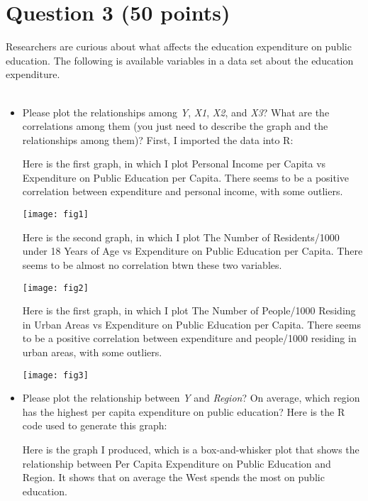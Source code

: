 \documentclass[12pt,letterpaper]{article}
\begin{document}
	\vspace{1cm}
	\section*{Question 3 (50 points)}
	
	\noindent Researchers are curious about what affects the education expenditure on public education. The following is available variables in a data set about the education expenditure. \\
	\\
		\begin{itemize}
		
		\item
		Please plot the relationships among \emph{Y}, \emph{X1}, \emph{X2}, and \emph{X3}? What are the correlations among them (you just need to describe the graph and the relationships among them)?
		\vspace{.5cm}
	\vspace{.5cm}
	\noindent First, I imported the data into R:
	   
	Here is the first graph, in which I plot Personal Income per Capita vs Expenditure on Public Education per Capita. There seems to be a positive correlation between expenditure and personal income, with some outliers.   
	
	\texttt{[image: fig1]}
	
	Here is the second graph, in which I plot The Number of Residents/1000 under 18 Years of Age vs Expenditure on Public Education per Capita. There seems to be almost no correlation btwn these two variables. 
	
	\texttt{[image: fig2]}
	
	Here is the first graph, in which I plot The Number of People/1000 Residing in Urban Areas vs Expenditure on Public Education per Capita. There seems to be a positive correlation between expenditure and people/1000 residing in urban areas, with some outliers.   
	
	\texttt{[image: fig3]}
	\vspace{.5cm}
	
	
		\item
		Please plot the relationship between \emph{Y} and \emph{Region}? On average, which region has the highest per capita expenditure on public education?
		Here is the R code used to generate this graph:


		  
		Here is the graph I produced, which is a box-and-whisker plot that shows the relationship between Per Capita Expenditure on Public Education and Region. It shows that on average the West spends the most on public education.
		

\end{itemize}
\end{document}
